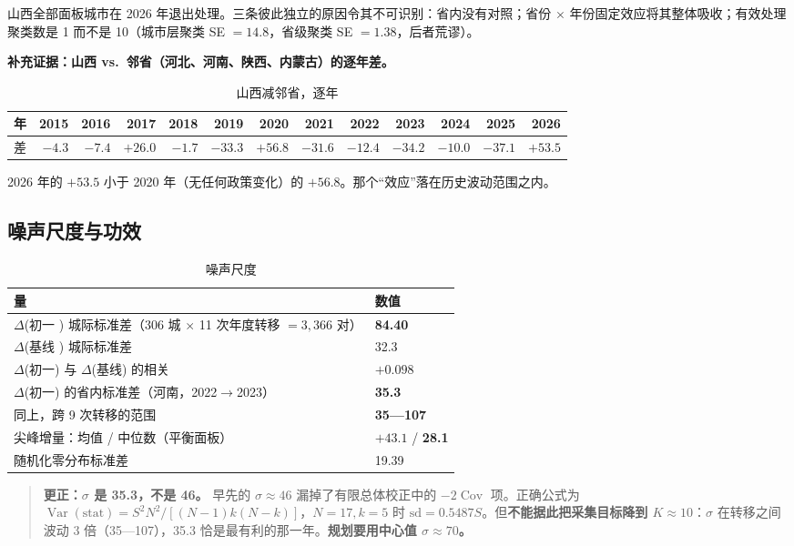 山西全部面板城市在 2026 年退出处理。三条彼此独立的原因令其不可识别：省内没有对照；省份 $\times$ 年份固定效应将其整体吸收；有效处理聚类数是 1 而不是 10（城市层聚类 SE $=14.8$，省级聚类 SE $=1.38$，后者荒谬）。

\textbf{补充证据：山西 vs.\ 邻省（河北、河南、陕西、内蒙古）的逐年差。}

\begin{table}[H]
\centering
\caption{山西减邻省，逐年}
\label{tab:shanxi-neighbor}
\scriptsize
\begin{tabular}{lrrrrrrrrrrrr}
\toprule
年 & 2015 & 2016 & \textbf{2017} & 2018 & 2019 & \textbf{2020} & 2021 & 2022 & 2023 & 2024 & 2025 & \textbf{2026} \\
\midrule
差 & $-4.3$ & $-7.4$ & $\mathbf{+26.0}$ & $-1.7$ & $-33.3$ & $\mathbf{+56.8}$ & $-31.6$ & $-12.4$ & $-34.2$ & $-10.0$ & $-37.1$ & $\mathbf{+53.5}$ \\
\bottomrule
\end{tabular}
\end{table}

2026 年的 $+53.5$ 小于 2020 年（无任何政策变化）的 $+56.8$。那个“效应”落在历史波动范围之内。

\subsection{噪声尺度与功效}

\begin{table}[H]
\centering
\caption{噪声尺度}
\label{tab:sigma}
\small
\begin{tabular}{L{9.0cm}R{3.6cm}}
\toprule
\textbf{量} & \textbf{数值} \\
\midrule
$\Delta$(初一 ) 城际标准差（306 城 $\times$ 11 次年度转移 $=3{,}366$ 对） & \textbf{84.40} \\
$\Delta$(基线 ) 城际标准差 & 32.3 \\
$\Delta$(初一) 与 $\Delta$(基线) 的相关 & $+0.098$ \\
$\Delta$(初一) 的省内标准差（河南，2022$\rightarrow$2023） & \textbf{35.3} \\
同上，跨 9 次转移的范围 & \textbf{35—107} \\
尖峰增量：均值 / 中位数（平衡面板） & $+43.1$ / \textbf{28.1} \\
随机化零分布标准差 & 19.39 \\
\bottomrule
\end{tabular}
\end{table}

\begin{quote}
\textbf{更正：$\sigma$ 是 35.3，不是 46。} 早先的 $\sigma\approx46$ 漏掉了有限总体校正中的 $-2\operatorname{Cov}$ 项。正确公式为 $\operatorname{Var}(\text{stat})=S^2N^2/[(N-1)k(N-k)]$，$N=17,k=5$ 时 $\mathrm{sd}=0.5487S$。但\textbf{不能据此把采集目标降到 $K\approx10$}：$\sigma$ 在转移之间波动 3 倍（35—107），35.3 恰是最有利的那一年。\textbf{规划要用中心值 $\sigma\approx70$。}
\end{quote}

